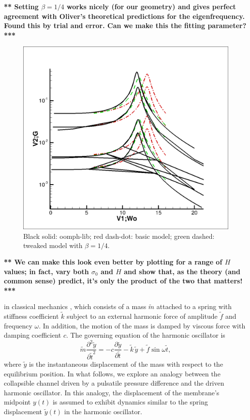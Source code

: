 \documentclass[aps,prl,reprint,superscriptaddress,floatfix]{revtex4-1}
\begin{document}
{\bf *** Setting $\beta =  1/4$ works nicely (for our geometry)
and gives perfect agreement with Oliver's theoretical predictions for
the eigenfrequency.
  Found this by trial and error. Can we make this the fitting
  parameter? ***}

\begin{figure}
\includegraphics[width=0.99\linewidth]{maple/ampl_comparison.png}
\caption{\label{comparison.png}Black solid: oomph-lib; red dash-dot:
  basic model; green dashed: tweaked model with $\beta = 1/4$.}
\end{figure}


{\bf *** We can make this look even better by plotting for a range of
$H$ values; in fact, vary both $\sigma_0$ and $H$ and show that,
as the theory (and common sense) predict, it's only the product
of the two that matters! ***}

\newpage



in classical mechanics \cite{Shabana91}, which consists of a mass $\widetilde{m}$ attached to a spring with stiffness coefficient $\widetilde{k}$ subject to an external harmonic force of amplitude $\widetilde f$ and frequency $\omega$. In addition, the motion of the mass is damped by viscous force with damping coefficient $c$. The governing equation of the harmonic oscillator is
\begin{equation}
\widetilde m\frac{\partial^2 \widetilde y}{\partial {\widetilde t}^2}=-c\frac{\partial \widetilde y}{\partial \widetilde t}-\widetilde k\,\widetilde y+\widetilde f\sin  \omega \widetilde t,
\label{eq:oscillator_eqn}
\end{equation}	
where $\widetilde y$ is the instantaneous displacement of the mass with respect to the equilibrium position. In what follows, we explore an analogy between the collapsible channel driven by a pulsatile pressure difference and the driven harmonic oscillator. In this analogy, the displacement of the membrane's midpoint $y(t)$ is assumed to exhibit dynamics similar to the spring displacement $\widetilde y(t)$ in the harmonic oscillator. 
\end{document}
